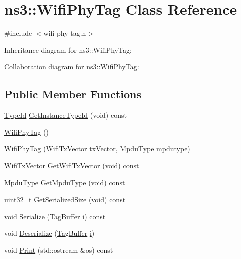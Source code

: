 \hypertarget{classns3_1_1WifiPhyTag}{}\section{ns3\+:\+:Wifi\+Phy\+Tag Class Reference}
\label{classns3_1_1WifiPhyTag}


{\ttfamily \#include $<$wifi-\/phy-\/tag.\+h$>$}



Inheritance diagram for ns3\+:\+:Wifi\+Phy\+Tag\+:


Collaboration diagram for ns3\+:\+:Wifi\+Phy\+Tag\+:
\subsection*{Public Member Functions}
\begin{DoxyCompactItemize}
\item 
\hyperlink{classns3_1_1TypeId}{Type\+Id} \hyperlink{classns3_1_1WifiPhyTag_a2254c7668fe84138210de51cb506259e}{Get\+Instance\+Type\+Id} (void) const 
\item 
\hyperlink{classns3_1_1WifiPhyTag_a87b17b55afd6df4016420ae58e58eaf0}{Wifi\+Phy\+Tag} ()
\item 
\hyperlink{classns3_1_1WifiPhyTag_a7b392c60294ac56a36643b1c08883d97}{Wifi\+Phy\+Tag} (\hyperlink{classns3_1_1WifiTxVector}{Wifi\+Tx\+Vector} tx\+Vector, \hyperlink{namespacens3_ae617d41bbd0c07fa58ee2306f687b055}{Mpdu\+Type} mpdutype)
\item 
\hyperlink{classns3_1_1WifiTxVector}{Wifi\+Tx\+Vector} \hyperlink{classns3_1_1WifiPhyTag_a99bdaf99ee9c3ec3b2200297f36e4fe6}{Get\+Wifi\+Tx\+Vector} (void) const 
\item 
\hyperlink{namespacens3_ae617d41bbd0c07fa58ee2306f687b055}{Mpdu\+Type} \hyperlink{classns3_1_1WifiPhyTag_a3fb626f71bdf873afa46204f58d6f1ba}{Get\+Mpdu\+Type} (void) const 
\item 
uint32\+\_\+t \hyperlink{classns3_1_1WifiPhyTag_abddb295fd7b759688731659869b4b743}{Get\+Serialized\+Size} (void) const 
\item 
void \hyperlink{classns3_1_1WifiPhyTag_a70ff0c5f9d0fcf88e6c00757b1c5f02d}{Serialize} (\hyperlink{classns3_1_1TagBuffer}{Tag\+Buffer} \hyperlink{lte__uplink__power__control_8m_a6f6ccfcf58b31cb6412107d9d5281426}{i}) const 
\item 
void \hyperlink{classns3_1_1WifiPhyTag_ac322c694a0a18c141f63086c34589b0a}{Deserialize} (\hyperlink{classns3_1_1TagBuffer}{Tag\+Buffer} \hyperlink{lte__uplink__power__control_8m_a6f6ccfcf58b31cb6412107d9d5281426}{i})
\item 
void \hyperlink{classns3_1_1WifiPhyTag_a150a17cb9c7cb828fd01c0dadd2ee04b}{Print} (std\+::ostream \&os) const 
\end{DoxyCompactItemize}
